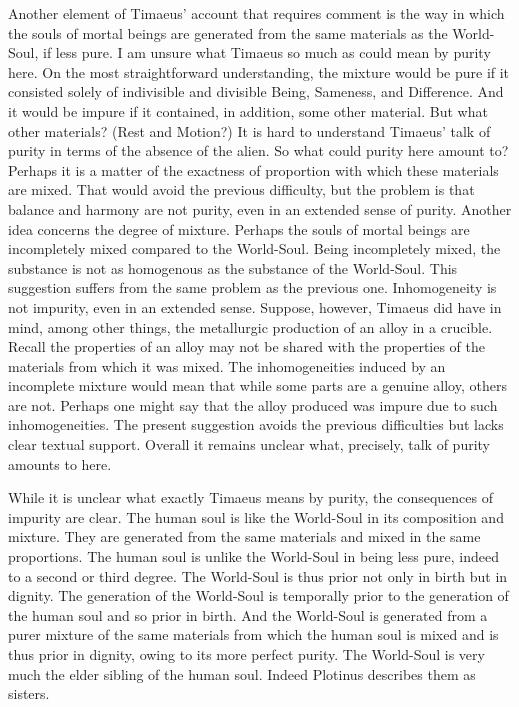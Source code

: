 Another element of Timaeus' account that requires comment is the way in which the souls of mortal beings are generated from the same materials as the World-Soul, if less pure. I am unsure what Timaeus so much as could mean by purity here. On the most straightforward understanding, the mixture would be pure if it consisted solely of indivisible and divisible Being, Sameness, and Difference. And it would be impure if it contained, in addition, some other material. But what other materials? (Rest and Motion?) It is hard to understand Timaeus' talk of purity in terms of the absence of the alien. So what could purity here amount to? Perhaps it is a matter of the exactness of proportion with which these materials are mixed. That would avoid the previous difficulty, but the problem is that balance and harmony are not purity, even in an extended sense of purity. Another idea concerns the degree of mixture. Perhaps the souls of mortal beings are incompletely mixed compared to the World-Soul. Being incompletely mixed, the substance is not as homogenous as the substance of the World-Soul. This suggestion suffers from the same problem as the previous one. Inhomogeneity is not impurity, even in an extended sense. Suppose, however, Timaeus did have in mind, among other things, the metallurgic production of an alloy in a crucible. Recall the properties of an alloy may not be shared with the properties of the materials from which it was mixed. The inhomogeneities induced by an incomplete mixture would mean that while some parts are a genuine alloy, others are not. Perhaps one might say that the alloy produced was impure due to such inhomogeneities. The present suggestion avoids the previous difficulties but lacks clear textual support. Overall it remains unclear what, precisely, talk of purity amounts to here.

While it is unclear what exactly Timaeus means by purity, the consequences of impurity are clear. The human soul is like the World-Soul in its composition and mixture. They are generated from the same materials and mixed in the same proportions. The human soul is unlike the World-Soul in being less pure, indeed to a second or third degree. The World-Soul is thus prior not only in birth but in dignity. The generation of the World-Soul is temporally prior to the generation of the human soul and so prior in birth. And the World-Soul is generated from a purer mixture of the same materials from which the human soul is mixed and is thus prior in dignity, owing to its more perfect purity. The World-Soul is very much the elder sibling of the human soul. Indeed Plotinus describes them as sisters.

